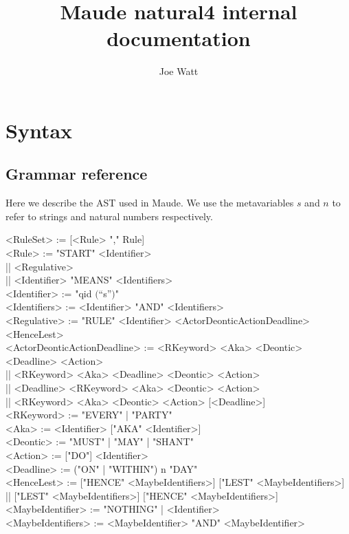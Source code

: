\documentclass{article}
\title{Maude natural4 internal documentation}
\author{Joe Watt}
\begin{document}
\maketitle


\tableofcontents

\newpage

\section{Syntax}

\subsection{Grammar reference}
Here we describe the AST used in Maude.
We use the metavariables $s$ and $n$ to refer to strings and natural numbers
respectively.

\begin{ebnf}
  <RuleSet> := [{<Rule> ","} Rule]
  \\
  <Rule> :=
    "START" <Identifier> \\
    || <Regulative> \\
    || <Identifier> "MEANS" <Identifiers>
  \\
  <Identifier> := "qid $\lparen$``s''$\rparen$"
  \\
  <Identifiers> := {<Identifier> "AND"} <Identifiers>
  \\
  <Regulative> :=
    "RULE" <Identifier>
    <ActorDeonticActionDeadline>
    <HenceLest>
  \\
  <ActorDeonticActionDeadline> :=
  <RKeyword> <Aka> <Deontic> <Deadline> <Action> \\
    || <RKeyword> <Aka> <Deadline> <Deontic> <Action> \\
    || <Deadline> <RKeyword> <Aka> <Deontic> <Action> \\
    || <RKeyword> <Aka> <Deontic> <Action> [<Deadline>]
  \\
  <RKeyword> := "EVERY" | "PARTY"
  \\
  <Aka> := <Identifier> ["AKA" <Identifier>]
  \\
  <Deontic> := "MUST" | "MAY" | "SHANT"
  \\
  <Action> := ["DO"] <Identifier>
  \\
  <Deadline> := ("ON" | "WITHIN") n "DAY"
  \\
  <HenceLest> := ["HENCE" <MaybeIdentifiers>] ["LEST" <MaybeIdentifiers>] \\
    || ["LEST" <MaybeIdentifiers>] ["HENCE" <MaybeIdentifiers>]
  \\
  <MaybeIdentifier> := "NOTHING" | <Identifier>
  \\
  <MaybeIdentifiers> := {<MaybeIdentifier> "AND"} <MaybeIdentifier>
\end{ebnf}
\end{document}
